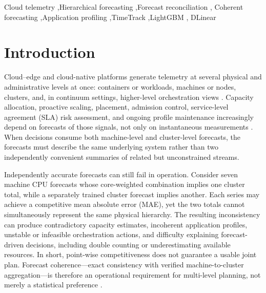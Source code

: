 \documentclass[a4paper,fleqn]{cas-dc}
\begin{document}
\begin{keywords}
Cloud telemetry \sep Hierarchical forecasting \sep Forecast reconciliation \sep
Coherent forecasting \sep Application profiling \sep TimeTrack \sep LightGBM \sep
{DLinear}
\end{keywords}

\maketitle

\section{Introduction}
\label{sec:introduction}

Cloud--edge and cloud-native platforms generate telemetry at several physical
and administrative levels at once: containers or workloads, machines or nodes,
clusters, and, in continuum settings, higher-level orchestration views
\cite{buyya2019manifesto,shi2016edge,satyanarayanan2017emergence}.
Capacity allocation, proactive scaling, placement, admission control,
service-level agreement ({SLA}) risk assessment, and ongoing profile maintenance
increasingly depend on forecasts of those signals, not only on instantaneous
measurements
\cite{lorido2014review,qu2018auto}.
When decisions consume both machine-level and cluster-level forecasts, the
forecasts must describe the same underlying system rather than two
independently convenient summaries of related but unconstrained streams.

Independently accurate forecasts can still fail in operation.
Consider seven machine {CPU} forecasts whose core-weighted combination implies
one cluster total, while a separately trained cluster forecast implies another.
Each series may achieve a competitive mean absolute error ({MAE}), yet the two
totals cannot simultaneously represent the same physical hierarchy.
The resulting inconsistency can produce contradictory capacity estimates,
incoherent application profiles, unstable or infeasible orchestration actions,
and difficulty explaining forecast-driven decisions, including double counting
or underestimating available resources.
In short, point-wise competitiveness does not guarantee a usable joint plan.
Forecast coherence---exact consistency with verified machine-to-cluster
aggregation---is therefore an operational requirement for multi-level planning,
not merely a statistical preference
\cite{hyndman2011optimal,athanasopoulos2024hierarchical}.
\end{document}
